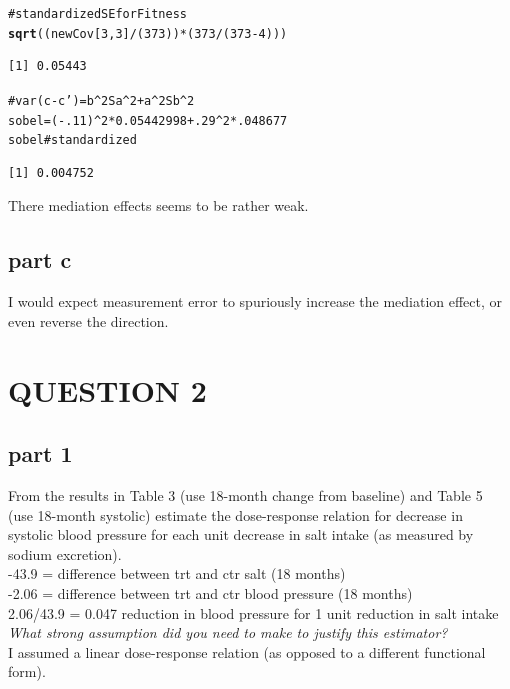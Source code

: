 \documentclass{article}\usepackage{graphicx, color}
\makeatletter
\newcommand{\hlfunctioncall}[1]{\textcolor[rgb]{0.501960784313725,0,0.329411764705882}{\textbf{#1}}}%
\newcommand{\hlcomment}[1]{\textcolor[rgb]{0.180392156862745,0.6,0.341176470588235}{#1}}%
\newenvironment{kframe}{%
 \def\at@end@of@kframe{}%
 \ifinner\ifhmode%
  \def\at@end@of@kframe{\end{minipage}}%
  \begin{minipage}{\columnwidth}%
 \fi\fi%
 \def\FrameCommand##1{\hskip\@totalleftmargin \hskip-\fboxsep
 \colorbox{shadecolor}{##1}\hskip-\fboxsep
     \hskip-\linewidth \hskip-\@totalleftmargin \hskip\columnwidth}%
 \MakeFramed {\advance\hsize-\width
   \@totalleftmargin\z@ \linewidth\hsize
   \@setminipage}}%
 {\par\unskip\endMakeFramed%
 \at@end@of@kframe}
\newenvironment{knitrout}{}{} %
\makeatother
\begin{document}
\begin{knitrout}
\begin{kframe}
\begin{alltt}
\hlcomment{# standardized SE for Fitness}
\hlfunctioncall{sqrt}((newCov[3,3]/(373))*(373 / (373-4))) 
\end{alltt}
\begin{verbatim}
[1] 0.05443
\end{verbatim}
\begin{alltt}

\hlcomment{# var(c-c')=b^2 Sa^2 + a^2 Sb^2}
sobel=(-.11)^2 * 0.05442998 + .29^2 *.048677 
sobel \hlcomment{# standardized}
\end{alltt}
\begin{verbatim}
[1] 0.004752
\end{verbatim}
\end{kframe}
\end{knitrout}

There mediation effects seems to be rather weak.

\subsection*{part c}
I would expect measurement error to spuriously increase the mediation effect, or even reverse the direction.


\newpage
\section*{QUESTION 2}
\subsection*{part 1}
From the results in Table 3 (use 18-month change from baseline) and Table 5 (use 18-month systolic) estimate the dose-response relation for decrease in systolic blood pressure for each unit decrease in salt intake (as measured by sodium excretion).\\
-43.9 = difference between trt and ctr salt (18 months)\\
-2.06 = difference between trt and ctr blood pressure (18 months)\\
2.06/43.9 = 0.047 reduction in blood pressure for 1 unit reduction in salt intake\\

\emph{What strong assumption did you need to make to justify this estimator?}\\
I assumed a linear dose-response relation (as opposed to a different functional form).\\
\end{document}
